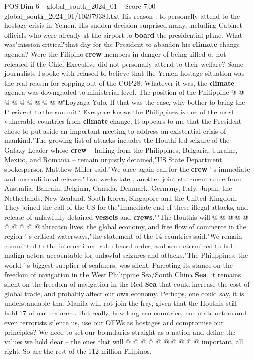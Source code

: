 \begin{textsample}{POS Dim 6 – global\_south\_2024\_01 – Score 7.00 – global\_south\_2024\_01/104979380.txt}
His reason : to personally attend to the hostage crisis in Yemen.
His sudden decision surprised many, including Cabinet officials who were already at the airport to \textbf{board} the presidential plane.
What was"mission critical"that day for the President to abandon his \textbf{climate} change agenda?
Were the Filipino \textbf{crew} members in danger of being killed or not released if the Chief Executive did not personally attend to their welfare?
Some journalists I spoke with refused to believe that the Yemen hostage situation was the real reason for copping out of the COP28.
Whatever it was, the \textbf{climate} agenda was downgraded to ministerial level.
The position of the Philippine @ @ @ @ @ @ @ @ @ @"Loyzaga-Yulo.
If that was the case, why bother to bring the President to the summit?
Everyone knows the Philippines is one of the most vulnerable countries from \textbf{climate} change.
It appears to me that the President chose to put aside an important meeting to address an existential crisis of mankind."The growing list of attacks includes the Houthi-led seizure of the Galaxy Leader whose \textbf{crew} -- hailing from the Philippines, Bulgaria, Ukraine, Mexico, and Romania -- remain unjustly detained,"US State Department spokesperson Matthew Miller said."We once again call for the \textbf{crew} ' s immediate and unconditional release."Two weeks later, another joint statement came from Australia, Bahrain, Belgium, Canada, Denmark, Germany, Italy, Japan, the Netherlands, New Zealand, South Korea, Singapore and the United Kingdom.
They joined the call of the US for the"immediate end of these illegal attacks, and release of unlawfully detained \textbf{vessels} and \textbf{crews}.""The Houthis will @ @ @ @ @ @ @ @ @ @ threaten lives, the global economy, and free flow of commerce in the region ' s critical waterways,"the statement of the 14 countries said."We remain committed to the international rules-based order, and are determined to hold malign actors accountable for unlawful seizures and attacks."The Philippines, the world ' s biggest supplier of seafarers, was silent.
Parroting its stance on the freedom of navigation in the West Philippine Sea/South China \textbf{Sea}, it remains silent on the freedom of navigation in the Red \textbf{Sea} that could increase the cost of global trade, and probably affect our own economy.
Perhaps, one could say, it is understandable that Manila will not join the fray, given that the Houthis still hold 17 of our seafarers.
But really, how long can countries, non-state actors and even terrorists silence us, use our OFWs as hostages and compromise our principles?
We need to set our boundaries straight as a nation and define the values we hold dear -- the ones that will @ @ @ @ @ @ @ @ @ @ important, all right.
So are the rest of the 112 million Filipinos.

\end{textsample}
